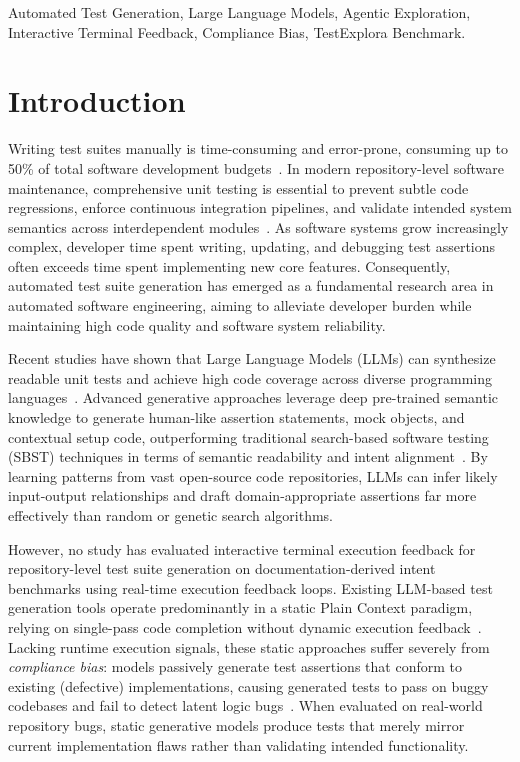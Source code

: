 \documentclass[conference]{IEEEtran}
\begin{document}
\begin{IEEEkeywords}
Automated Test Generation, Large Language Models, Agentic Exploration, Interactive Terminal Feedback, Compliance Bias, TestExplora Benchmark.
\end{IEEEkeywords}

\section{Introduction}
\label{sec:intro}

Writing test suites manually is time-consuming and error-prone, consuming up to 50\% of total software development budgets~\cite{myers2011art, evosuite, randoop, swebench}. In modern repository-level software maintenance, comprehensive unit testing is essential to prevent subtle code regressions, enforce continuous integration pipelines, and validate intended system semantics across interdependent modules~\cite{docprompting, repobench, cse}. As software systems grow increasingly complex, developer time spent writing, updating, and debugging test assertions often exceeds time spent implementing new core features. Consequently, automated test suite generation has emerged as a fundamental research area in automated software engineering, aiming to alleviate developer burden while maintaining high code quality and software system reliability.

Recent studies have shown that Large Language Models (LLMs) can synthesize readable unit tests and achieve high code coverage across diverse programming languages~\cite{bareiss2022code, lemieux2023codamosa, xie2023chatunitest}. Advanced generative approaches leverage deep pre-trained semantic knowledge to generate human-like assertion statements, mock objects, and contextual setup code, outperforming traditional search-based software testing (SBST) techniques in terms of semantic readability and intent alignment~\cite{siddiq2023exploratory, schafer2023empirical}. By learning patterns from vast open-source code repositories, LLMs can infer likely input-output relationships and draft domain-appropriate assertions far more effectively than random or genetic search algorithms.

However, no study has evaluated interactive terminal execution feedback for repository-level test suite generation on documentation-derived intent benchmarks using real-time execution feedback loops. Existing LLM-based test generation tools operate predominantly in a static Plain Context paradigm, relying on single-pass code completion without dynamic execution feedback~\cite{testexplora}. Lacking runtime execution signals, these static approaches suffer severely from \textit{compliance bias}: models passively generate test assertions that conform to existing (defective) implementations, causing generated tests to pass on buggy codebases and fail to detect latent logic bugs~\cite{testexplora, sweagent}. When evaluated on real-world repository bugs, static generative models produce tests that merely mirror current implementation flaws rather than validating intended functionality.
\end{document}
